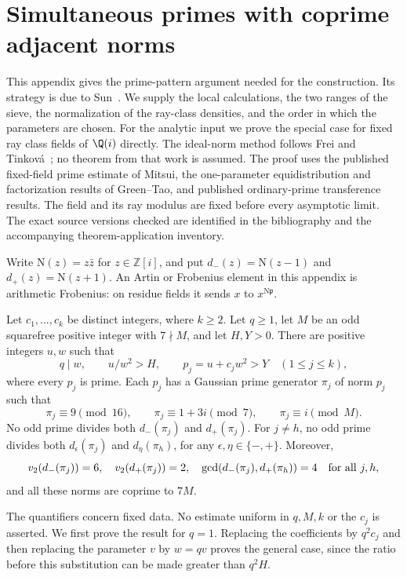 \section{Simultaneous primes with coprime adjacent norms}
\label{sec:v5-sun-proof}

This appendix gives the prime-pattern argument needed for the construction.
Its strategy is due to Sun~\cite{v5sun}. We supply the local calculations,
the two ranges of the sieve, the normalization of the ray-class densities,
and the order in which the parameters are chosen. For the analytic input
we prove the special case for fixed ray class fields of $\Q(i)$ directly.
The ideal-norm method follows Frei and Tinkov\'a~\cite{v5ft}; no theorem
from that work is assumed. The proof uses the published fixed-field prime
estimate of Mitsui, the one-parameter equidistribution and factorization
results of Green--Tao, and published ordinary-prime transference results.
The field and its ray modulus are fixed before every asymptotic limit.
The exact source versions checked are identified in the bibliography
and the accompanying theorem-application inventory.

Write $\mathrm N(z)=z\bar z$ for $z\in\mathbb Z[i]$, and put
$d_-(z)=\mathrm N(z-1)$ and $d_+(z)=\mathrm N(z+1)$.
An Artin or Frobenius element in this appendix is arithmetic Frobenius:
on residue fields it sends $x$ to $x^{\mathrm N\mathfrak p}$.

\begin{theorem}\label{thm:v5-simultaneous-primes}
Let $c_1,\ldots,c_k$ be distinct integers, where $k\geq2$.
Let $q\geq1$, let $M$ be an odd squarefree positive integer with $7\nmid M$,
and let $H,Y>0$. There are positive integers $u,w$ such that
\[
 q\mid w,\qquad u/w^2>H,\qquad p_j=u+c_jw^2>Y
 \quad(1\leq j\leq k),
\]
where every $p_j$ is prime. Each $p_j$ has a Gaussian prime generator
$\pi_j$ of norm $p_j$ such that
\[
 \pi_j\equiv9\pmod {16},\qquad
 \pi_j\equiv1+3i\pmod7,\qquad
 \pi_j\equiv i\pmod M.
\]
No odd prime divides both $d_-(\pi_j)$ and $d_+(\pi_j)$.
For $j\ne h$, no odd prime divides both $d_\epsilon(\pi_j)$ and
$d_\eta(\pi_h)$, for any $\epsilon,\eta\in\{-,+\}$.
Moreover,
\[
 v_2(d_-(\pi_j))=6,\quad v_2(d_+(\pi_j))=2,\quad
 \gcd(d_-(\pi_j),d_+(\pi_h))=4\quad\hbox{for all }j,h,
\]
and all these norms are coprime to $7M$.
\end{theorem}

The quantifiers concern fixed data. No estimate uniform in $q,M,k$ or the
$c_j$ is asserted. We first prove the result for $q=1$. Replacing the
coefficients by $q^2c_j$ and then replacing the parameter $v$ by $w=qv$
proves the general case, since the ratio before this substitution can be
made greater than $q^2H$.

